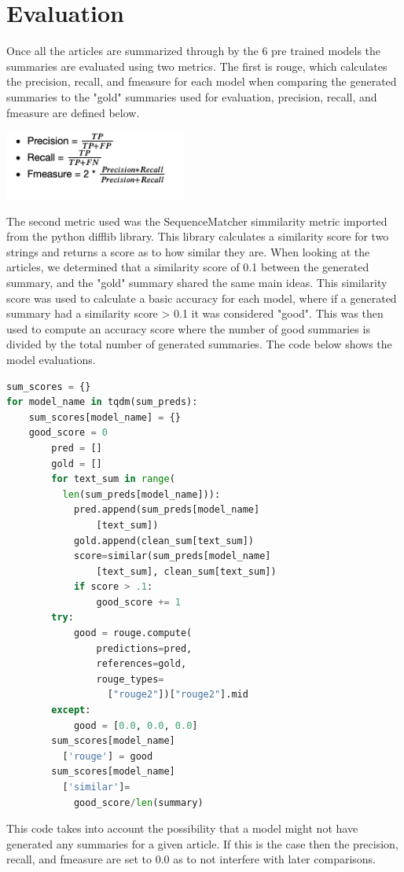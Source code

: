 \documentclass[twoside,twocolumn]{article}
\begin{document}

\section{Evaluation}

Once all the articles are summarized through by the 6 pre trained models the summaries are evaluated using two metrics. The first is rouge, which calculates the precision, recall, and fmeasure for each model when comparing the generated summaries to the "gold" summaries used for evaluation, precision, recall, and fmeasure are defined below. 

\includegraphics[width=0.45\textwidth,height=0.9\textheight,keepaspectratio]{report/metrics.png}

The second metric used was the SequenceMatcher simmilarity metric imported from the python difflib library. This library calculates a similarity score for two strings and returns a score as to how similar they are. When looking at the articles, we determined that a similarity score of 0.1 between the generated summary, and the "gold" summary shared the same main ideas. This similarity score was used to calculate a basic accuracy for each model, where if a generated summary had a similarity score > 0.1 it was considered "good". This was then used to compute an accuracy score where the number of good summaries is divided by the total number of generated summaries. The code below shows the model evaluations.

\begin{lstlisting}[language=Python]
sum_scores = {}
for model_name in tqdm(sum_preds):
    sum_scores[model_name] = {}
    good_score = 0
        pred = []
        gold = []
        for text_sum in range(
          len(sum_preds[model_name])):
            pred.append(sum_preds[model_name]
                [text_sum])
            gold.append(clean_sum[text_sum])
            score=similar(sum_preds[model_name]
                [text_sum], clean_sum[text_sum])
            if score > .1:
                good_score += 1
        try:
            good = rouge.compute(
                predictions=pred, 
                references=gold, 
                rouge_types=
                  ["rouge2"])["rouge2"].mid
        except:
            good = [0.0, 0.0, 0.0] 
        sum_scores[model_name]
          ['rouge'] = good
        sum_scores[model_name]
          ['similar']=
            good_score/len(summary)
\end{lstlisting}
This code takes into account the possibility that a model might not have generated any summaries for a given article. If this is the case then the precision, recall, and fmeasure are set to 0.0 as to not interfere with later comparisons. 
\end{document}
